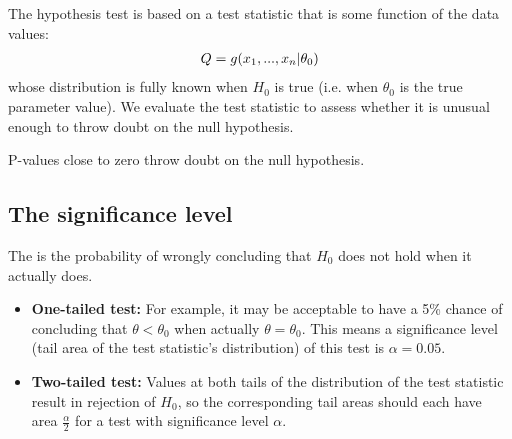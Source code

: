 The hypothesis test is based on a test statistic that is some function of the data values:
\begin{align}
    Q = g(x_1,...,x_n\vert\theta_0) \notag
\end{align}
whose distribution is fully known when $H_0$ is true (i.e. when $\theta_0$ is the true parameter value). We evaluate the test statistic to assess whether it is unusual enough to throw doubt on the null hypothesis.

\begin{center}
\end{center}

\begin{theorem}
    P-values close to zero throw doubt on the null hypothesis.
\end{theorem}

\subsection{The significance level}

\begin{definition}
    The  is the probability of wrongly concluding that $H_0$ does not hold when it actually does.
\end{definition}

\begin{itemize}
    \item \textbf{One-tailed test:} For example, it may be acceptable to have a 5\% chance of concluding that $\theta<\theta_0$ when actually $\theta=\theta_0$. This means a significance level (tail area of the test statistic's distribution) of this test is $\alpha=0.05$.
    \item \textbf{Two-tailed test:} Values at both tails of the distribution of the test statistic result in rejection of $H_0$, so the corresponding tail areas should each have area $\frac{\alpha}{2}$ for a test with significance level $\alpha$.
\end{itemize}

